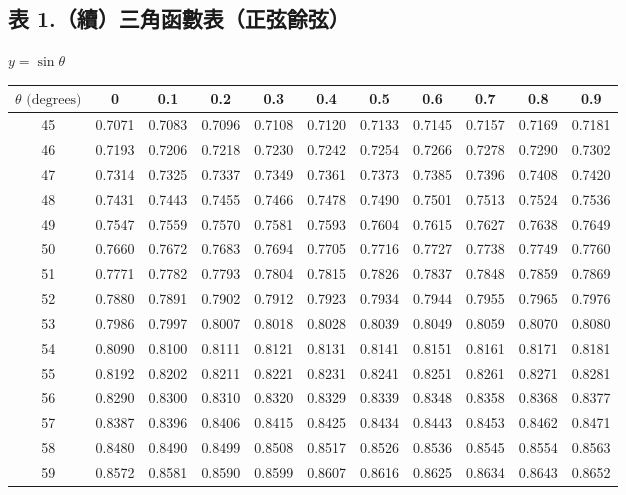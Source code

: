 \subsection*{表 1.\quad （續）三角函數表（正弦餘弦）}
\begin{center} $y = \sin\theta$ \end{center}
{\centering\fontsize{7.5pt}{8.8pt}\selectfont\setlength{\tabcolsep}{3.5pt}\renewcommand{\arraystretch}{0.96}
\begin{tabular}{|c|cccccccccc|}
\hline
$\theta\text{ (degrees)}$ & 0 & 0.1 & 0.2 & 0.3 & 0.4 & 0.5 & 0.6 & 0.7 & 0.8 & 0.9 \\ \hline
45 & 0.7071 & 0.7083 & 0.7096 & 0.7108 & 0.7120 & 0.7133 & 0.7145 & 0.7157 & 0.7169 & 0.7181 \\
46 & 0.7193 & 0.7206 & 0.7218 & 0.7230 & 0.7242 & 0.7254 & 0.7266 & 0.7278 & 0.7290 & 0.7302 \\
47 & 0.7314 & 0.7325 & 0.7337 & 0.7349 & 0.7361 & 0.7373 & 0.7385 & 0.7396 & 0.7408 & 0.7420 \\
48 & 0.7431 & 0.7443 & 0.7455 & 0.7466 & 0.7478 & 0.7490 & 0.7501 & 0.7513 & 0.7524 & 0.7536 \\
49 & 0.7547 & 0.7559 & 0.7570 & 0.7581 & 0.7593 & 0.7604 & 0.7615 & 0.7627 & 0.7638 & 0.7649 \\
\hline
50 & 0.7660 & 0.7672 & 0.7683 & 0.7694 & 0.7705 & 0.7716 & 0.7727 & 0.7738 & 0.7749 & 0.7760 \\
51 & 0.7771 & 0.7782 & 0.7793 & 0.7804 & 0.7815 & 0.7826 & 0.7837 & 0.7848 & 0.7859 & 0.7869 \\
52 & 0.7880 & 0.7891 & 0.7902 & 0.7912 & 0.7923 & 0.7934 & 0.7944 & 0.7955 & 0.7965 & 0.7976 \\
53 & 0.7986 & 0.7997 & 0.8007 & 0.8018 & 0.8028 & 0.8039 & 0.8049 & 0.8059 & 0.8070 & 0.8080 \\
54 & 0.8090 & 0.8100 & 0.8111 & 0.8121 & 0.8131 & 0.8141 & 0.8151 & 0.8161 & 0.8171 & 0.8181 \\
\hline
55 & 0.8192 & 0.8202 & 0.8211 & 0.8221 & 0.8231 & 0.8241 & 0.8251 & 0.8261 & 0.8271 & 0.8281 \\
56 & 0.8290 & 0.8300 & 0.8310 & 0.8320 & 0.8329 & 0.8339 & 0.8348 & 0.8358 & 0.8368 & 0.8377 \\
57 & 0.8387 & 0.8396 & 0.8406 & 0.8415 & 0.8425 & 0.8434 & 0.8443 & 0.8453 & 0.8462 & 0.8471 \\
58 & 0.8480 & 0.8490 & 0.8499 & 0.8508 & 0.8517 & 0.8526 & 0.8536 & 0.8545 & 0.8554 & 0.8563 \\
59 & 0.8572 & 0.8581 & 0.8590 & 0.8599 & 0.8607 & 0.8616 & 0.8625 & 0.8634 & 0.8643 & 0.8652 \\

\end{tabular}}

